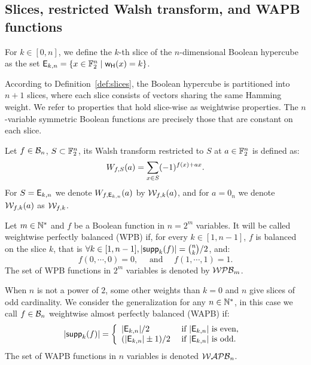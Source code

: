 \documentclass[11pt]{llncs}
\begin{document}
\subsection{Slices, restricted Walsh transform, and WAPB functions}




\begin{definition}\label{def:slices}
	For $k \in [0,n]$, we define the $k$-th slice of the $n$-dimensional Boolean hypercube as the set $\mathsf{E}_{k,n} = \{x \in \mathbb{F}_2^n \mid \mathsf{w_H}(x) = k\}$.
\end{definition}

According to Definition~\ref{def:slices}, the Boolean hypercube is partitioned into $n+1$ slices, where each slice consists of vectors sharing the same Hamming weight.
We refer to properties that hold slice-wise as weightwise properties.
The $n$-variable symmetric Boolean functions are precisely those that are constant on each slice.



\begin{definition}\label{def:restWalsh}
	Let $f\in \mathcal{B}_{n}$, $S \subset \mathbb{F}_2^n$, its Walsh transform restricted to $S$ at $a \in \mathbb{F}_2^n$ is defined as:
	\[  W_{f,S} (a) = \sum_{x\in S} (-1)^{f(x)+ax}.\]
	For $S=\mathsf{E}_{k,n}$ we denote $W_{f,\mathsf{E}_{k,n}} (a)$ by $\mathcal{W}_{f,k}(a)$, and for $a= 0_{n}$ we denote $\mathcal{W}_{f,k}(a)$ as $\mathcal{W}_{f,k}$.

\end{definition}


\begin{definition}\label{def:WPB}
	Let $m\in \mathbb{N}^*$ and $f$ be a Boolean function in $n=2^m$ variables. It will be called weightwise perfectly balanced (WPB) if, for every $k\in[1,n-1]$, $f$ is balanced on the slice $k$, that is $\forall k \in [1,n-1], |\mathsf{supp}_{k}(f)|=\binom{n}{k}/2$, and:
	\[f(0,\cdots,0)=0,\quad \text{ and } \quad f(1,\cdots,1)=1.\]
	The set of WPB functions in $2^m$ variables is denoted by $\mathcal{WPB}_{m}$.

	When $n$ is not a power of $2$, some other weights than $k=0$ and $n$ give slices of odd cardinality. We consider the generalization for any $n\in \mathbb{N}^*$, in this case we call $f\in \mathcal{B}_{n}$ weightwise almost perfectly balanced (WAPB) if:
	\[|\mathsf{supp}_{k}(f)|= \left \{
	\begin{array}{l l}
	|\mathsf{E}_{k,n}|/2  & \text{ if } |\mathsf{E}_{k,n}| \text{ is even, } \\
	(|\mathsf{E}_{k,n}|\pm 1)/2  & \text{ if }  |\mathsf{E}_{k,n}| \text{ is odd.}
	\end{array}\right.\]
	The set of WAPB functions in $n$ variables is denoted $\mathcal{WAPB}_{n}$.

\end{definition}
\end{document}
